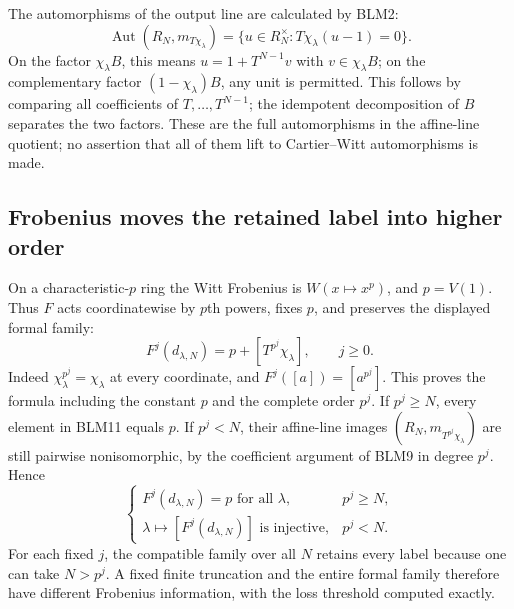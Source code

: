 The automorphisms of the output line are calculated by BLM2:
\begin{equation}\tag{BLM10}
\operatorname{Aut}(R_N,m_{T\chi_\lambda})
=\{u\in R_N^\times:T\chi_\lambda(u-1)=0\}.
\end{equation}
On the factor $\chi_\lambda B$, this means
$u=1+T^{N-1}v$ with $v\in\chi_\lambda B$; on the complementary
factor $(1-\chi_\lambda)B$, any unit is permitted. This follows
by comparing all coefficients of $T,\ldots,T^{N-1}$; the
idempotent decomposition of $B$ separates the two factors.
These are the full automorphisms in the affine-line quotient;
no assertion that all of them lift to Cartier--Witt
automorphisms is made.

\subsection{Frobenius moves the retained label into higher order}
On a characteristic-$p$ ring the Witt Frobenius is $W(x\mapsto
x^p)$, and $p=V(1)$. Thus $F$ acts coordinatewise by $p$th
powers, fixes $p$, and preserves the displayed formal family:
\begin{equation}\tag{BLM11}
F^j(d_{\lambda,N})=p+[T^{p^j}\chi_\lambda],\qquad j\ge0.
\end{equation}
Indeed $\chi_\lambda^{p^j}=\chi_\lambda$ at every coordinate,
and $F^j([a])=[a^{p^j}]$. This proves the formula including
the constant $p$ and the complete order $p^j$.
If $p^j\ge N$, every element in BLM11 equals $p$. If $p^j<N$,
their affine-line images $(R_N,m_{T^{p^j}\chi_\lambda})$
are still pairwise nonisomorphic, by the coefficient argument
of BLM9 in degree $p^j$. Hence
\begin{equation}\tag{BLM12}
\begin{cases}
F^j(d_{\lambda,N})=p\text{ for all }\lambda,&p^j\ge N,\\
\lambda\mapsto[F^j(d_{\lambda,N})]\text{ is injective},&p^j<N.
\end{cases}
\end{equation}
For each fixed $j$, the compatible family over all $N$ retains
every label because one can take $N>p^j$. A fixed finite
truncation and the entire formal family therefore have different
Frobenius information, with the loss threshold computed exactly.

